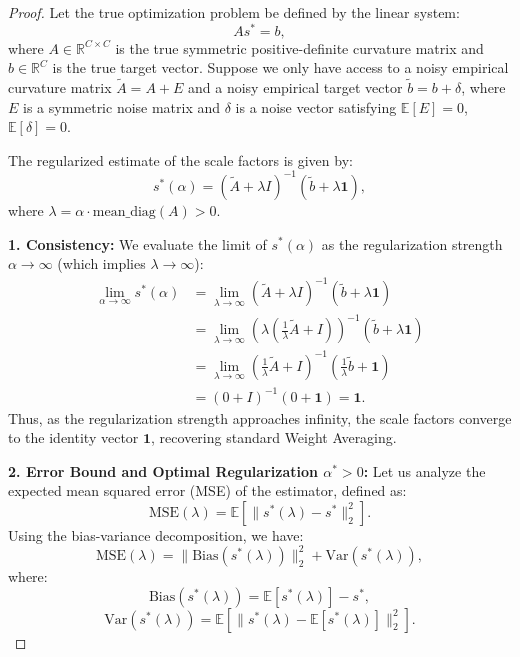 \documentclass{article}
\theoremstyle{plain}
\theoremstyle{definition}
\theoremstyle{remark}
\begin{document}
\begin{proof}
Let the true optimization problem be defined by the linear system:
\begin{equation}
    A s^* = b,
\end{equation}
where $A \in \mathbb{R}^{C \times C}$ is the true symmetric positive-definite curvature matrix and $b \in \mathbb{R}^C$ is the true target vector.
Suppose we only have access to a noisy empirical curvature matrix $\tilde{A} = A + E$ and a noisy empirical target vector $\tilde{b} = b + \delta$, where $E$ is a symmetric noise matrix and $\delta$ is a noise vector satisfying $\mathbb{E}[E] = 0$, $\mathbb{E}[\delta] = 0$.

The regularized estimate of the scale factors is given by:
\begin{equation}
    s^*(\alpha) = (\tilde{A} + \lambda I)^{-1} (\tilde{b} + \lambda \mathbf{1}),
\end{equation}
where $\lambda = \alpha \cdot \text{mean\_diag}(A) > 0$.

\textbf{1. Consistency:}
We evaluate the limit of $s^*(\alpha)$ as the regularization strength $\alpha \to \infty$ (which implies $\lambda \to \infty$):
\begin{align}
    \lim_{\alpha \to \infty} s^*(\alpha) &= \lim_{\lambda \to \infty} (\tilde{A} + \lambda I)^{-1} (\tilde{b} + \lambda \mathbf{1}) \nonumber\\
    &= \lim_{\lambda \to \infty} \left( \lambda \left( \frac{1}{\lambda} \tilde{A} + I \right) \right)^{-1} \left( \tilde{b} + \lambda \mathbf{1} \right) \nonumber\\
    &= \lim_{\lambda \to \infty} \left( \frac{1}{\lambda} \tilde{A} + I \right)^{-1} \left( \frac{1}{\lambda} \tilde{b} + \mathbf{1} \right) \nonumber\\
    &= (0 + I)^{-1} (0 + \mathbf{1}) = \mathbf{1}.
\end{align}
Thus, as the regularization strength approaches infinity, the scale factors converge to the identity vector $\mathbf{1}$, recovering standard Weight Averaging.

\textbf{2. Error Bound and Optimal Regularization $\alpha^* > 0$:}
Let us analyze the expected mean squared error (MSE) of the estimator, defined as:
\begin{equation}
    \text{MSE}(\lambda) = \mathbb{E}[\|s^*(\lambda) - s^*\|_2^2].
\end{equation}
Using the bias-variance decomposition, we have:
\begin{equation}
    \text{MSE}(\lambda) = \|\text{Bias}(s^*(\lambda))\|_2^2 + \text{Var}(s^*(\lambda)),
\end{equation}
where:
\begin{equation}
    \text{Bias}(s^*(\lambda)) = \mathbb{E}[s^*(\lambda)] - s^*,
\end{equation}
\begin{equation}
    \text{Var}(s^*(\lambda)) = \mathbb{E}[\|s^*(\lambda) - \mathbb{E}[s^*(\lambda)]\|_2^2].
\end{equation}


\end{proof}
\end{document}
